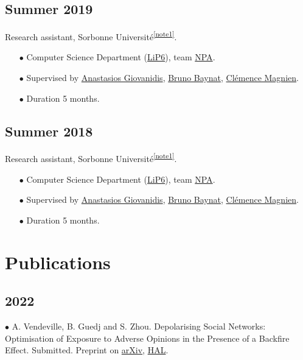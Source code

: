 \documentclass[a4paper,10pt]{article}
\begin{document}
\subsection*{Summer 2019} 
Research assistant, Sorbonne Université\textsuperscript{\ref{note1}}.
\begin{itemize}
	\item[$\bullet$] Computer Science Department (\href{https://www.lip6.fr/}{LiP6}), team \href{https://www-npa.lip6.fr/}{NPA}.
	\item[$\bullet$] Supervised by \href{https://anastasiosgiovanidis.net/}{Anastasios Giovanidis}, \href{https://www.lip6.fr/actualite/personnes-fiche.php?ident=P144}{Bruno Baynat}, \href{https://www-complexnetworks.lip6.fr/~magnien/}{Clémence Magnien}.
	\item[$\bullet$] Duration 5 months.
\end{itemize}

\subsection*{Summer 2018} 
Research assistant, Sorbonne Université\textsuperscript{\ref{note1}}.
\begin{itemize}
	\item[$\bullet$] Computer Science Department (\href{https://www.lip6.fr/}{LiP6}), team \href{https://www-npa.lip6.fr/}{NPA}.
	\item[$\bullet$] Supervised by \href{https://anastasiosgiovanidis.net/}{Anastasios Giovanidis}, \href{https://www.lip6.fr/actualite/personnes-fiche.php?ident=P144}{Bruno Baynat}, \href{https://www-complexnetworks.lip6.fr/~magnien/}{Clémence Magnien}.
	\item[$\bullet$] Duration 5 months.
\end{itemize}

\section*{Publications}

\subsection*{2022}
$\bullet$ A. Vendeville, B. Guedj and S. Zhou. Depolarising Social Networks: Optimisation of Exposure to Adverse Opinions in the Presence of a Backfire Effect. Submitted. Preprint on \href{https://arxiv.org/abs/2203.02002}{arXiv}, \href{https://hal.inria.fr/hal-03600429}{HAL}.
\end{document}
